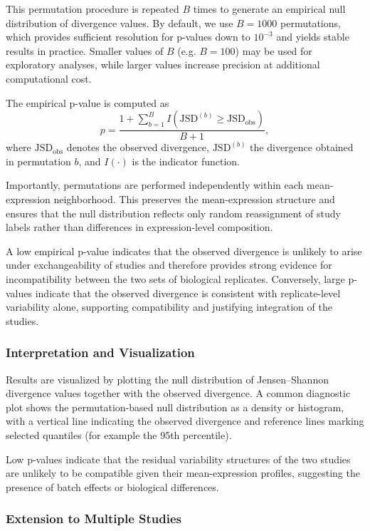 This permutation procedure is repeated $B$ times to generate an empirical null distribution of divergence values. By default, we use $B = 1000$ permutations, which provides sufficient resolution for p-values down to $10^{-3}$ and yields stable results in practice. Smaller values of $B$ (e.g. $B = 100$) may be used for exploratory analyses, while larger values increase precision at additional computational cost.

The empirical p-value is computed as
\[
p = \frac{1 + \sum_{b=1}^{B} I\!\left(\mathrm{JSD}^{(b)} \ge \mathrm{JSD}_{\mathrm{obs}}\right)}{B + 1},
\]
where $\mathrm{JSD}_{\mathrm{obs}}$ denotes the observed divergence, $\mathrm{JSD}^{(b)}$ the divergence obtained in permutation $b$, and $I(\cdot)$ is the indicator function.

Importantly, permutations are performed independently within each mean-expression neighborhood. This preserves the mean-expression structure and ensures that the null distribution reflects only random reassignment of study labels rather than differences in expression-level composition.

A low empirical p-value indicates that the observed divergence is unlikely to arise under exchangeability of studies and therefore provides strong evidence for incompatibility between the two sets of biological replicates. Conversely, large p-values indicate that the observed divergence is consistent with replicate-level variability alone, supporting compatibility and justifying integration of the studies.

\subsubsection{Interpretation and Visualization}

Results are visualized by plotting the null distribution of Jensen--Shannon divergence values together with the observed divergence. A common diagnostic plot shows the permutation-based null distribution as a density or histogram, with a vertical line indicating the observed divergence and reference lines marking selected quantiles (for example the 95th percentile).

Low p-values indicate that the residual variability structures of the two studies are unlikely to be compatible given their mean-expression profiles, suggesting the presence of batch effects or biological differences.

\subsubsection{Extension to Multiple Studies}
\label{ssec:multi_study_gjct}


